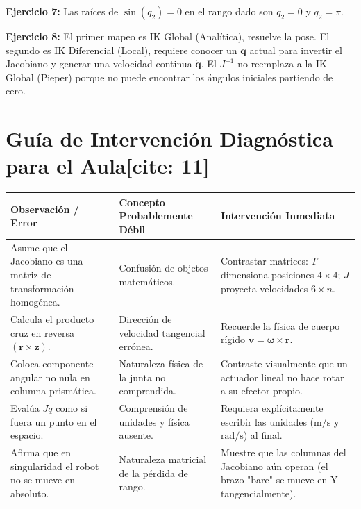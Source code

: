 \documentclass[11pt, a4paper]{article}
\begin{document}
\textbf{Ejercicio 7:} Las raíces de $\sin(q_2) = 0$ en el rango dado son $q_2 = 0$ y $q_2 = \pi$.

\textbf{Ejercicio 8:} El primer mapeo es IK Global (Analítica), resuelve la pose. El segundo es IK Diferencial (Local), requiere conocer un $\mathbf{q}$ actual para invertir el Jacobiano y generar una velocidad continua $\dot{\mathbf{q}}$. El $J^{-1}$ no reemplaza a la IK Global (Pieper) porque no puede encontrar los ángulos iniciales partiendo de cero.

\vspace{0.5cm}

\section*{Guía de Intervención Diagnóstica para el Aula[cite: 11]}
\renewcommand{\arraystretch}{1.5}
\begin{tabularx}{\textwidth}{|X|X|X|}
\hline
\rowcolor{gray!20} \textbf{Observación / Error} & \textbf{Concepto Probablemente Débil} & \textbf{Intervención Inmediata} \\ \hline
Asume que el Jacobiano es una matriz de transformación homogénea. & Confusión de objetos matemáticos. & Contrastar matrices: $T$ dimensiona posiciones $4\times4$; $J$ proyecta velocidades $6\times n$. \\ \hline
Calcula el producto cruz en reversa $(\mathbf{r} \times \mathbf{z})$. & Dirección de velocidad tangencial errónea. & Recuerde la física de cuerpo rígido $\mathbf{v} = \boldsymbol{\omega} \times \mathbf{r}$. \\ \hline
Coloca componente angular no nula en columna prismática. & Naturaleza física de la junta no comprendida. & Contraste visualmente que un actuador lineal no hace rotar a su efector propio. \\ \hline
Evalúa $J\dot{q}$ como si fuera un punto en el espacio. & Comprensión de unidades y física ausente. & Requiera explícitamente escribir las unidades ($\mathrm{m/s}$ y $\mathrm{rad/s}$) al final. \\ \hline
Afirma que en singularidad el robot no se mueve en absoluto. & Naturaleza matricial de la pérdida de rango. & Muestre que las columnas del Jacobiano aún operan (el brazo "bare" se mueve en Y tangencialmente). \\ \hline
\end{tabularx}
\end{document}
